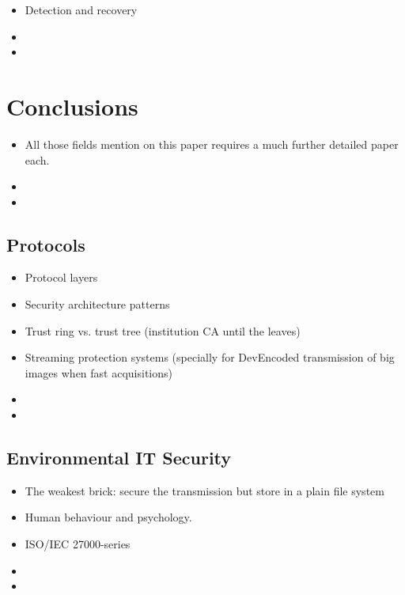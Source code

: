 \documentclass[10pt,a4paper,twoside]{llncs}
\begin{document}
\begin{itemize}
 \item Detection and recovery
 \item 
 \item 
\end{itemize}

%
\section{Conclusions \label{sec:conclusions}}

\begin{itemize}
 \item All those fields mention on this paper requires a much further detailed paper each.
 \item 
 \item
\end{itemize}

%
\subsection{Protocols \label{sec:protocols}}

\begin{itemize}
 \item Protocol layers \cite{Schneier:1995:ACP:572932}
 \item Security architecture patterns
 \item Trust ring vs. trust tree (institution CA until the leaves)
 \item Streaming protection systems (specially for DevEncoded transmission of big images when fast acquisitions)
 \item 
 \item 
\end{itemize}

%
\subsection{Environmental IT Security \label{sec:environment}}

\begin{itemize}
 \item The weakest brick: secure the transmission but store in a plain file system
 \item Human behaviour and psychology.
 \item ISO/IEC 27000-series
 \item 
 \item
\end{itemize}
\end{document}
